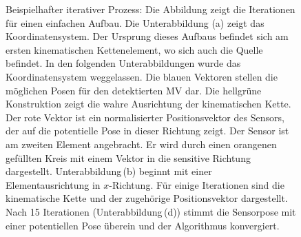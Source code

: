 \begin{figure}[h]
    \centering
    
    \label{fig:legendKinChain}
    \caption{Beispielhafter iterativer Prozess: Die Abbildung zeigt die Iterationen für einen einfachen Aufbau. Die Unterabbildung (a) zeigt das Koordinatensystem. Der Ursprung dieses Aufbaus befindet sich am ersten kinematischen Kettenelement, wo sich auch die Quelle befindet. In den folgenden Unterabbildungen wurde das Koordinatensystem weggelassen. Die blauen Vektoren stellen die möglichen Posen für den detektierten MV dar. Die hellgrüne Konstruktion zeigt die wahre Ausrichtung der kinematischen Kette. Der rote Vektor ist ein normalisierter Positionsvektor des Sensors, der auf die potentielle Pose in dieser Richtung zeigt. Der Sensor ist am zweiten Element angebracht. Er wird durch einen orangenen gefüllten Kreis mit einem Vektor in die sensitive Richtung dargestellt. Unterabbildung\,(b) beginnt mit einer Elementausrichtung in $x$-Richtung. Für einige Iterationen sind die kinematische Kette und der zugehörige Positionsvektor dargestellt. Nach 15 Iterationen (Unterabbildung\,(d)) stimmt die Sensorpose mit einer potentiellen Pose überein und der Algorithmus konvergiert.}
    \label{fig:Concept_Algorithm}
\end{figure}

